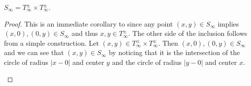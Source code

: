 \documentclass[11pt,a4paper]{article}
\begin{document}
\begin{corollary}
  $S_{\infty} = T^{\pm}_{\infty} \times T^{\pm}_{\infty}$.
\end{corollary}
\begin{proof}
  This is an immediate corollary to  since
  any point $(x,y) \in S_{\infty}$ implies $(x,0),(0,y) \in S_{\infty}$
  and thus $x,y \in T_{\infty}^{\pm}$.
  The other side of the inclusion follows from a simple construction.
  Let $(x,y) \in T^{\pm}_{\infty} \times T^{\pm}_{\infty}$.
  Then $(x,0),(0,y) \in S_{\infty}$ and we can see that $(x,y) \in S_{\infty}$
  by noticing that it is the intersection of the circle of radius
  $|x-0|$ and center $y$ and the circle of radius $|y-0|$ and center $x$.
  \begin{center}
  \end{center}
\end{proof}
\end{document}
